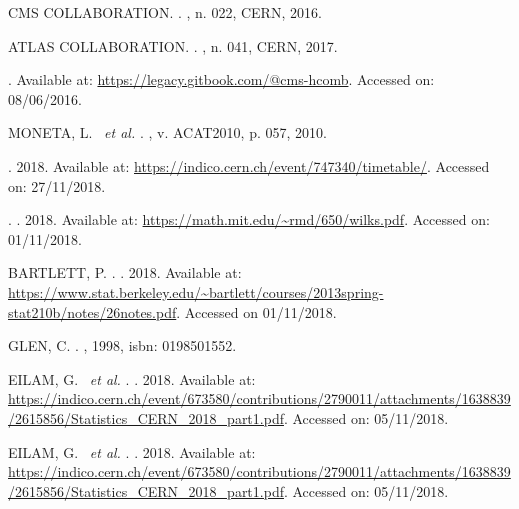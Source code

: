 \begin{thebibliography}{}
CMS COLLABORATION.
.
, n. 022, CERN, 2016.

ATLAS COLLABORATION.
.
, n. 041, CERN, 2017.

.
Available at: \url{https://legacy.gitbook.com/@cms-hcomb}.
Accessed on: 08/06/2016.

MONETA, L. ~\textit{et al.}
.
, v. ACAT2010, p. 057, 2010.

.
2018.
Available at: \url{https://indico.cern.ch/event/747340/timetable/}.
Accessed on: 27/11/2018.

. 
.
2018.
Available at: \url{https://math.mit.edu/~rmd/650/wilks.pdf}.
Accessed on: 01/11/2018.

BARTLETT, P.
. 
.
2018.
Available at: \url{https://www.stat.berkeley.edu/~bartlett/courses/2013spring-stat210b/notes/26notes.pdf}.
Accessed on 01/11/2018.

GLEN, C.
.
, 1998, isbn: 0198501552.

EILAM, G. ~\textit{et al.}
. 
.
2018.
Available at: \url{https://indico.cern.ch/event/673580/contributions/2790011/attachments/1638839/2615856/Statistics\_CERN\_2018\_part1.pdf}.
Accessed on: 05/11/2018.

EILAM, G. ~\textit{et al.}
. 
.
2018.
Available at: \url{https://indico.cern.ch/event/673580/contributions/2790011/attachments/1638839/2615856/Statistics\_CERN\_2018\_part1.pdf}.
Accessed on: 05/11/2018.



\end{thebibliography}
